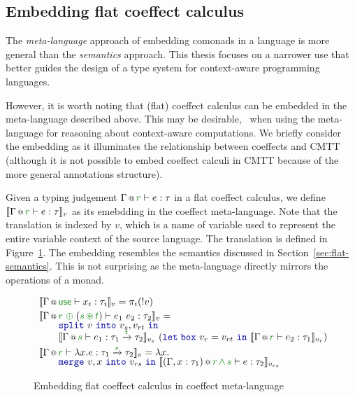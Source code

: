 
\subsection{Embedding flat coeffect calculus}

The \emph{meta-language} approach of embedding comonads in a language is more general than the
\emph{semantics} approach. This thesis focuses on a narrower use that better guides the design of
a type system for context-aware programming languages. 

However, it is worth noting that 
(flat) coeffect calculus can be embedded in the meta-language described above. This may be 
desirable, \eg~when using the meta-language for reasoning about context-aware computations. 
We briefly consider the embedding as it illuminates the relationship between coeffects and
CMTT (although it is not possible to embed coeffect calculi in CMTT because of the more general
annotations structure).

Given a typing judgement $\coctx{\Gamma}{\cclrd{r}} \vdash e : \tau$ in a flat coeffect calculus,
we define $\sem{\coctx{\Gamma}{\cclrd{r}} \vdash e : \tau}_v$ as its emebdding in the coeffect
meta-language. Note that the translation is indexed by $v$, which is a name of variable used 
to represent the entire variable context of the source language. The translation is defined in
Figure~\ref{fig:conclusions-embed}. The embedding resembles the semantics discussed in 
Section~\ref{sec:flat-semantics}. This is not surprising as the meta-language directly mirrors
the operations of a monad.


\begin{figure}[t]
\begin{equation*}
\begin{array}{l}
 \sem{ \coctx{\Gamma}{\cunit}\vdash x_i : \tau_i }_v = \pi_i (!v) \\[0.25em]
 \sem{ \coctx{\Gamma}{\cclrd{r}\;\cpar\;(\cclrd{s}\,\cseq\,\cclrd{t})} \vdash e_1~e_2 : \tau_2 }_v =\\[-0.25em]
   \qquad \kvd{split}~v~\kvd{into}~v_s, v_{rt}~\kvd{in} \\[-0.25em]
   \qquad \sem{ \coctx{\Gamma}{\cclrd{s}} \vdash e_1 : \tau_1 \xrightarrow{\cclrd{t}} \tau_2 }_{v_s}
      ~(\kvd{let\;box}~v_r = v_{rt}~\kvd{in}~\sem{ \coctx{\Gamma}{\cclrd{r}} \vdash e_2 : \tau_1}_{v_r}) \\[0.25em]
 \sem{ \coctx{\Gamma}{\cclrd{r}} \vdash \lambda x.e:\tau_1 \xrightarrow{\cclrd{s}} \tau_2 }_v = \lambda x. \\[-0.25em]
   \qquad \kvd{merge}~v,x~\kvd{into}~v_{rs}~\kvd{in}~\sem{ \coctx{(\Gamma,x:\tau_1)}{\cclrd{r}\,\czip\,\cclrd{s}} \vdash e : \tau_2 }_{v_{rs}}
\end{array}
\end{equation*}
\caption{Embedding flat coeffect calculus in coeffect meta-language }
\label{fig:conclusions-embed}
\end{figure}

